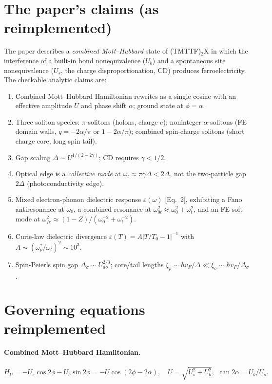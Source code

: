 \documentclass[11pt]{article}
\begin{document}
\section{The paper's claims (as reimplemented)}
The paper describes a \emph{combined Mott--Hubbard} state of (TMTTF)$_2$X in which
the interference of a built-in bond nonequivalence ($U_b$) and a spontaneous site
nonequivalence ($U_s$, the charge disproportionation, CD) produces ferroelectricity.
The checkable analytic claims are:
\begin{enumerate}
\item Combined Mott--Hubbard Hamiltonian rewrites as a single cosine with an
      effective amplitude $U$ and phase shift $\alpha$; ground state at $\phi=\alpha$.
\item Three soliton species: $\pi$-solitons (holons, charge $e$); noninteger
      $\alpha$-solitons (FE domain walls, $q=-2\alpha/\pi$ or $1-2\alpha/\pi$);
      combined spin-charge solitons (short charge core, long spin tail).
\item Gap scaling $\Delta\sim U^{1/(2-2\gamma)}$; CD requires $\gamma<1/2$.
\item Optical edge is a \emph{collective mode} at $\omega_t\approx\pi\gamma\Delta<2\Delta$,
      not the two-particle gap $2\Delta$ (photoconductivity edge).
\item Mixed electron-phonon dielectric response $\varepsilon(\omega)$ [Eq.~2],
      exhibiting a Fano antiresonance at $\omega_0$, a combined resonance at
      $\omega_{0t}^2\approx\omega_0^2+\omega_t^2$, and an FE soft mode at
      $\omega_{fe}^2\approx(1-Z)/(\omega_0^{-2}+\omega_t^{-2})$.
\item Curie-law dielectric divergence $\varepsilon(T)=A|T/T_0-1|^{-1}$ with
      $A\sim(\omega_p^*/\omega_t)^2\sim10^3$.
\item Spin-Peierls spin gap $\Delta_\sigma\sim U_{ao}^{2/3}$; core/tail lengths
      $\xi_\rho\sim\hbar v_F/\Delta\ll\xi_\sigma\sim\hbar v_F/\Delta_\sigma$.
\end{enumerate}

\section{Governing equations reimplemented}
\paragraph{Combined Mott--Hubbard Hamiltonian.}
\begin{equation}
H_U = -U_s\cos 2\phi - U_b\sin 2\phi = -U\cos(2\phi-2\alpha),\quad
U=\sqrt{U_s^2+U_b^2},\ \ \tan 2\alpha = U_b/U_s .
\end{equation}
\end{document}
